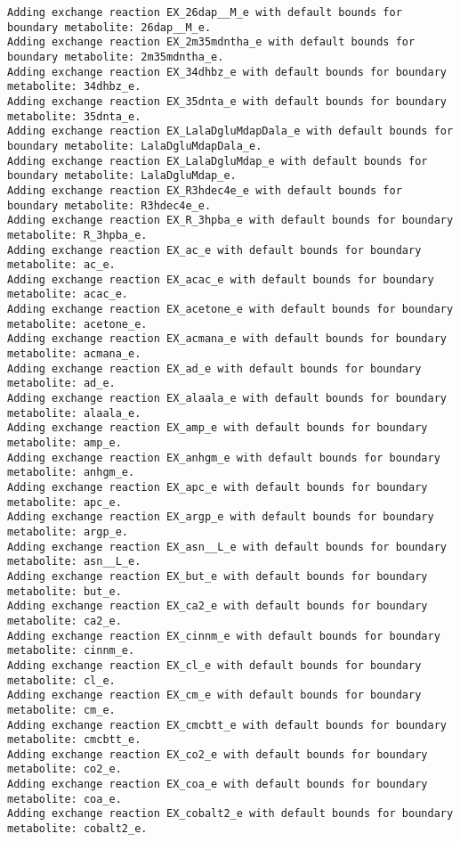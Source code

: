 \documentclass[
  letterpaper,
  DIV=11,
  numbers=noendperiod]{scrartcl}
\begin{document}
\begin{verbatim}
Adding exchange reaction EX_26dap__M_e with default bounds for boundary metabolite: 26dap__M_e.
Adding exchange reaction EX_2m35mdntha_e with default bounds for boundary metabolite: 2m35mdntha_e.
Adding exchange reaction EX_34dhbz_e with default bounds for boundary metabolite: 34dhbz_e.
Adding exchange reaction EX_35dnta_e with default bounds for boundary metabolite: 35dnta_e.
Adding exchange reaction EX_LalaDgluMdapDala_e with default bounds for boundary metabolite: LalaDgluMdapDala_e.
Adding exchange reaction EX_LalaDgluMdap_e with default bounds for boundary metabolite: LalaDgluMdap_e.
Adding exchange reaction EX_R3hdec4e_e with default bounds for boundary metabolite: R3hdec4e_e.
Adding exchange reaction EX_R_3hpba_e with default bounds for boundary metabolite: R_3hpba_e.
Adding exchange reaction EX_ac_e with default bounds for boundary metabolite: ac_e.
Adding exchange reaction EX_acac_e with default bounds for boundary metabolite: acac_e.
Adding exchange reaction EX_acetone_e with default bounds for boundary metabolite: acetone_e.
Adding exchange reaction EX_acmana_e with default bounds for boundary metabolite: acmana_e.
Adding exchange reaction EX_ad_e with default bounds for boundary metabolite: ad_e.
Adding exchange reaction EX_alaala_e with default bounds for boundary metabolite: alaala_e.
Adding exchange reaction EX_amp_e with default bounds for boundary metabolite: amp_e.
Adding exchange reaction EX_anhgm_e with default bounds for boundary metabolite: anhgm_e.
Adding exchange reaction EX_apc_e with default bounds for boundary metabolite: apc_e.
Adding exchange reaction EX_argp_e with default bounds for boundary metabolite: argp_e.
Adding exchange reaction EX_asn__L_e with default bounds for boundary metabolite: asn__L_e.
Adding exchange reaction EX_but_e with default bounds for boundary metabolite: but_e.
Adding exchange reaction EX_ca2_e with default bounds for boundary metabolite: ca2_e.
Adding exchange reaction EX_cinnm_e with default bounds for boundary metabolite: cinnm_e.
Adding exchange reaction EX_cl_e with default bounds for boundary metabolite: cl_e.
Adding exchange reaction EX_cm_e with default bounds for boundary metabolite: cm_e.
Adding exchange reaction EX_cmcbtt_e with default bounds for boundary metabolite: cmcbtt_e.
Adding exchange reaction EX_co2_e with default bounds for boundary metabolite: co2_e.
Adding exchange reaction EX_coa_e with default bounds for boundary metabolite: coa_e.
Adding exchange reaction EX_cobalt2_e with default bounds for boundary metabolite: cobalt2_e.

\end{verbatim}
\end{document}
